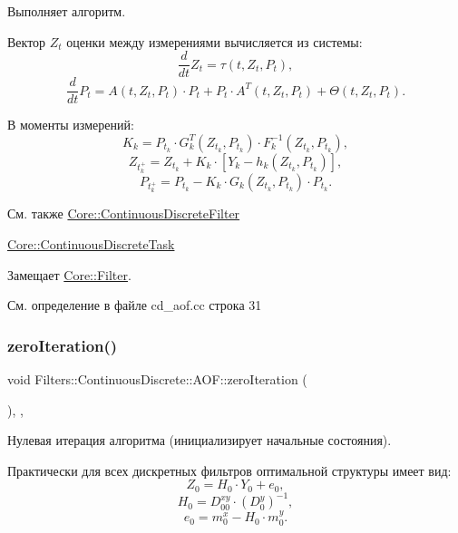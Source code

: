 Выполняет алгоритм. 

Вектор $Z_t$ оценки между измерениями вычисляется из системы\+: \[\frac{d}{dt}Z_t = \tau(t,Z_t, P_t),\] \[\frac{d}{dt}P_t = A(t,Z_t, P_t) \cdot P_t + P_t \cdot A^T(t,Z_t, P_t) + \Theta(t,Z_t,P_t).\]

В моменты измерений\+: \[K_k = P_{t_k} \cdot G_k^T(Z_{t_k}, P_{t_k}) \cdot F_k^{-1}(Z_{t_k}, P_{t_k}),\] \[Z_{t_k^+} = Z_{t_k} + K_k \cdot [Y_k - h_k(Z_{t_k}, P_{t_k})],\] \[P_{t_k^+} = P_{t_k} - K_k \cdot G_k(Z_{t_k},P_{t_k}) \cdot P_{t_k}.\]

\begin{DoxySeeAlso}{См. также}
\hyperlink{class_core_1_1_continuous_discrete_filter}{Core\+::\+Continuous\+Discrete\+Filter} 

\hyperlink{class_core_1_1_continuous_discrete_task}{Core\+::\+Continuous\+Discrete\+Task} 
\end{DoxySeeAlso}


Замещает \hyperlink{class_core_1_1_filter_a438681ee3e54aba2148042d9f8011ab8}{Core\+::\+Filter}.



См. определение в файле cd\+\_\+aof.\+cc строка 31

\hypertarget{class_filters_1_1_continuous_discrete_1_1_a_o_f_ab350a4de87a9e2c2e8b01e178d61f3b5}{}\label{class_filters_1_1_continuous_discrete_1_1_a_o_f_ab350a4de87a9e2c2e8b01e178d61f3b5} 
\subsubsection{\texorpdfstring{zero\+Iteration()}{zeroIteration()}}
{\footnotesize\ttfamily void Filters\+::\+Continuous\+Discrete\+::\+A\+O\+F\+::zero\+Iteration (\begin{DoxyParamCaption}{ }\end{DoxyParamCaption})\hspace{0.3cm}{\ttfamily [override]}, {\ttfamily [protected]}, {\ttfamily [virtual]}}



Нулевая итерация алгоритма (инициализирует начальные состояния). 

Практически для всех дискретных фильтров оптимальной структуры имеет вид\+: \[Z_0 = H_0 \cdot Y_0 + e_0,\] \[H_0 = D_{00}^{xy} \cdot (D_0^y)^{-1},\] \[e_0 = m_0^x - H_0 \cdot m_0^y.\]

